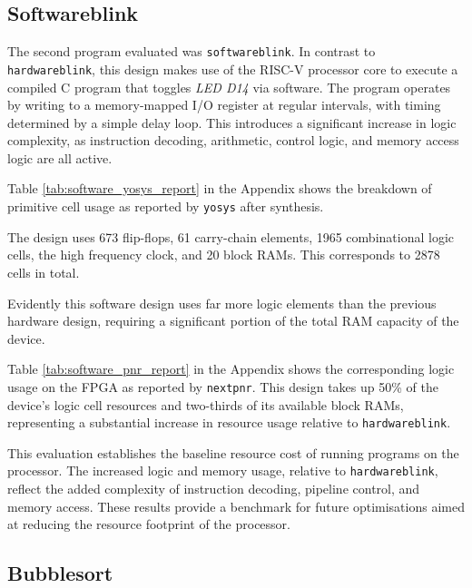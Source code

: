 \documentclass[a4paper,10pt]{article}
\begin{document}
\subsection{Softwareblink}
\label{sec:Softwareblink}

The second program evaluated was \texttt{softwareblink}. 
In contrast to \texttt{hardwareblink}, 
this design makes use of the RISC-V processor core 
to execute a compiled C program that toggles \textit{LED D14} via software. 
The program operates by writing to a memory-mapped I/O register at regular intervals, 
with timing determined by a simple delay loop. 
This introduces a significant increase in logic complexity, 
as instruction decoding, arithmetic, control logic, and memory access logic 
are all active.

\iffalse
To synthesise this design, \texttt{softwareblink.c} was compiled 
using the RISC-V GCC toolchain into \texttt{program.hex} and \texttt{data.hex}, 
which were then loaded into the processor design 
before synthesis using \texttt{yosys} and place-and-route using \texttt{nextpnr}.
\fi

Table \ref{tab:software_yosys_report} in the Appendix 
shows the breakdown of primitive cell usage 
as reported by \texttt{yosys} after synthesis.

The design uses 673 flip-flops,
61 carry-chain elements,
1965 combinational logic cells,
the high frequency clock,
and 20 block RAMs.
This corresponds to 2878 cells in total.

Evidently this software design uses far more logic elements
than the previous hardware design,
requiring a significant portion of the total RAM capacity of the device.

Table \ref{tab:software_pnr_report} in the Appendix
shows the corresponding logic usage 
on the FPGA as reported by \texttt{nextpnr}. 
This design takes up 50\% of the device's logic cell resources 
and two-thirds of its available block RAMs, 
representing a substantial increase in resource usage 
relative to \texttt{hardwareblink}.

This evaluation establishes the baseline resource cost 
of running programs on the processor. 
The increased logic and memory usage, relative to \texttt{hardwareblink}, 
reflect the added complexity of 
instruction decoding, pipeline control, and memory access. 
These results provide a benchmark for future optimisations 
aimed at reducing the resource footprint of the processor.

\subsection{Bubblesort}
\label{sec:Bubblesort}
\end{document}
